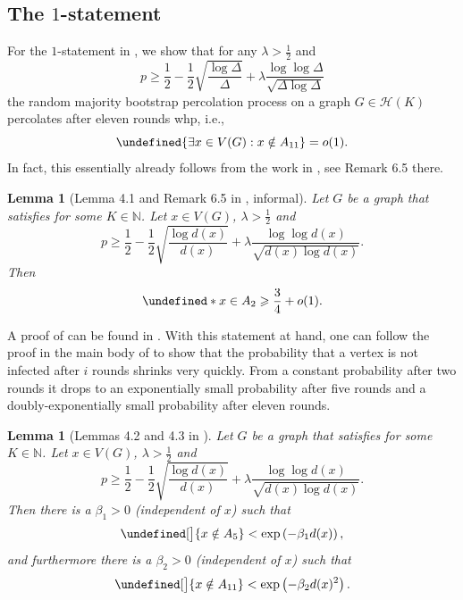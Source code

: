 \documentclass[reqno,a4paper,11pt]{amsart}
\newtheorem{lemma}[theorem]{Lemma}
\theoremstyle{definition}
\renewcommand{\geq}{\geqslant}
\let\Pr\undefined
\begin{document}
\subsection{The $1$-statement}\label{s:proofof1statement}

For the $1$-statement in , we show that for any $\lambda > \frac{1}{2}$ and
\[
  p \geq \frac{1}{2} - \frac{1}{2} \sqrt{\frac{\log \Delta}{\Delta}} + \lambda \frac{\log \log \Delta}{\sqrt{\Delta \log \Delta}}
\]
the random majority bootstrap percolation process on a graph $G \in \mathcal{H}(K)$ percolates after eleven rounds whp, i.e.,
\[
  \Pr{\exists x \in V(G): x \notin A_{11}} =o(1).
\]
In fact, this essentially already follows from the work in \cite{CEGK24}, see Remark 6.5 there.
\begin{lemma}[Lemma 4.1 and Remark 6.5 in \cite{CEGK24}, informal]\label{l:constant}
  Let $G$ be a graph that satisfies  for some $K \in \mathbb{N}$.
  Let $x\in V(G)$, $\lambda > \frac{1}{2}$ and
  \[
    p \geq \frac{1}{2} - \frac{1}{2} \sqrt{\frac{\log d(x)}{d(x)}} + \lambda \frac{\log \log d(x)}{\sqrt{d(x) \log d(x)}}.
  \]
  Then
  \[
    \Pr*{x \in A_2} \geq \frac{3}{4} + o(1).
  \]
\end{lemma}

A proof of  can be found in \cite[Appendix A]{CEGK24}.
With this statement at hand, one can follow the proof in the main body of \cite{CEGK24} to show that the probability that a vertex is not infected after $i$ rounds shrinks very quickly.
From a constant probability after two rounds it drops to an exponentially small probability after five rounds and a doubly-exponentially small probability after eleven rounds.

\begin{lemma}[Lemmas 4.2 and 4.3 in \cite{CEGK24}]\label{l:super-exponential}
  Let $G$ be a graph that satisfies  for some $K \in \mathbb{N}$.
  Let $x\in V(G)$, $\lambda > \frac{1}{2}$ and
  \[
    p \geq \frac{1}{2} - \frac{1}{2} \sqrt{\frac{\log d(x)}{d(x)}} + \lambda \frac{\log \log d(x)}{\sqrt{d(x) \log d(x)}}.
  \]
  Then there is a $\beta_1>0$ (independent of $x$) such that
  \[
    \Pr[\big]{x \notin A_{5}}< \exp\left(-\beta_1 d(x)\right),
  \]
  and furthermore there is a $\beta_2>0$ (independent of $x$) such that
  \[
    \Pr[\big]{x \notin A_{11}}< \exp\left(-\beta_2 d(x)^2\right).
  \]
\end{lemma}
\end{document}
